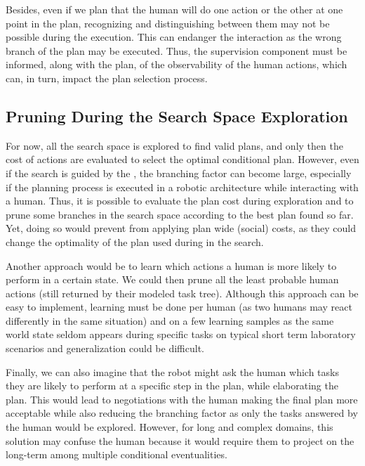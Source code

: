\documentclass[a4paper,11pt,twoside]{StyleThese}
\begin{document}
Besides, even if we plan that the human will do one action or the other at one point in the plan, recognizing and distinguishing between them may not be possible during the execution. This can endanger the interaction as the wrong branch of the plan may be executed. Thus, the supervision component must be informed, along with the plan, of the observability of the human actions, which can, in turn, impact the plan selection process.


\subsection{Pruning During the Search Space Exploration}
For now, all the search space is explored to find valid plans, and only then the cost of actions are evaluated to select the optimal conditional plan. However, even if the search is guided by the , the branching factor can become large, especially if the planning process is executed in a robotic architecture while interacting with a human. Thus, it is possible to evaluate the plan cost during exploration and to prune some branches in the search space according to the best plan found so far. Yet, doing so would prevent from applying plan wide (social) costs, as they could change the optimality of the plan used during in the search.

Another approach would be to learn which actions a human is more likely to perform in a certain state. We could then prune all the least probable human actions (still returned by their modeled task tree). Although this approach can be easy to implement, learning must be done per human (as two humans may react differently in the same situation) and on a few learning samples as the same world state seldom appears during specific tasks on typical short term laboratory scenarios and generalization could be difficult.

Finally, we can also imagine that the robot might ask the human which tasks they are likely to perform at a specific step in the plan, while elaborating the plan. This would lead to negotiations with the human making the final plan more acceptable while also reducing the branching factor as only the tasks answered by the human would be explored. However, for long and complex domains, this solution may confuse the human because it would require them to project on the long-term among multiple conditional eventualities.
\end{document}
